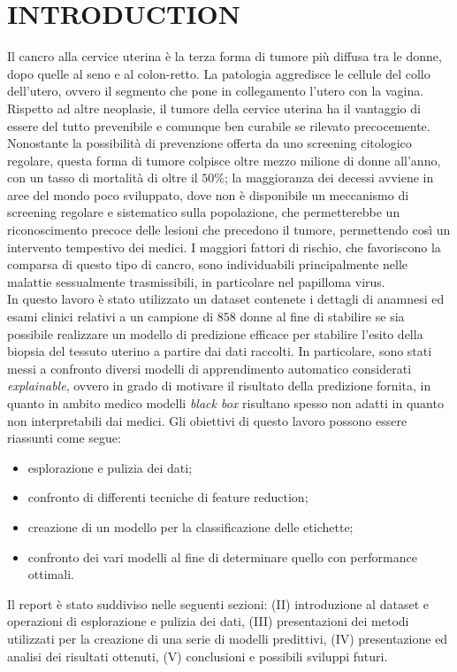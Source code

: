 \section{INTRODUCTION}
Il cancro alla cervice uterina è la terza forma di tumore più diffusa tra le donne, dopo quelle al seno e al colon-retto. La patologia aggredisce le cellule del collo dell’utero, ovvero il segmento che pone in collegamento l’utero con la vagina. Rispetto ad altre neoplasie, il tumore della cervice uterina ha il vantaggio di essere del tutto prevenibile e comunque ben curabile se rilevato precocemente. 
Nonostante la possibilità di prevenzione offerta da uno screening citologico regolare, questa forma di tumore colpisce oltre mezzo milione di donne all'anno, con un tasso di mortalità di oltre il $50\%$; la maggioranza dei decessi avviene in aree del mondo poco sviluppato, dove non è disponibile un meccanismo di screening regolare e sistematico sulla popolazione, che permetterebbe un riconoscimento precoce delle lesioni che precedono il tumore, permettendo così un intervento tempestivo dei medici.
I maggiori fattori di rischio, che favoriscono la comparsa di questo tipo di cancro, sono individuabili principalmente nelle malattie sessualmente trasmissibili, in particolare nel papilloma virus.\\
In questo lavoro è stato utilizzato un dataset contenete i dettagli di anamnesi ed esami clinici relativi a un campione di $858$ donne al fine di stabilire se sia possibile realizzare un modello di predizione efficace per stabilire l'esito della biopsia del tessuto uterino a partire dai dati raccolti.
In particolare, sono stati messi a confronto diversi modelli di apprendimento automatico considerati \textit{explainable}, ovvero in grado di motivare il risultato della predizione fornita, in quanto in ambito medico modelli \textit{black box} risultano spesso non adatti in quanto non interpretabili dai medici.
Gli obiettivi di questo lavoro possono essere riassunti come segue:
\begin{itemize}
	\item esplorazione e pulizia dei dati;
	\item confronto di differenti tecniche di feature reduction;
	\item creazione di un modello per la classificazione delle etichette;
	\item confronto dei vari modelli al fine di determinare quello con performance ottimali.
\end{itemize}
Il report è stato suddiviso nelle seguenti sezioni: (II) introduzione al dataset e operazioni di esplorazione e pulizia dei dati, (III) presentazioni dei metodi utilizzati per la creazione di una serie di modelli predittivi, (IV) presentazione ed analisi dei risultati ottenuti, (V) conclusioni e possibili sviluppi futuri.